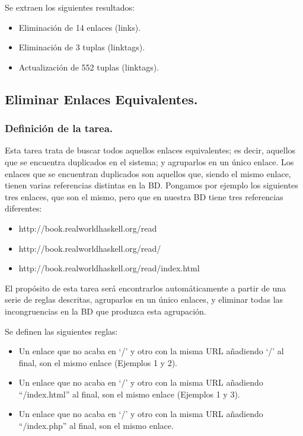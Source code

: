 Se extraen los siguientes resultados:
\begin{itemize}
\item    Eliminación de 14 enlaces (links).
\item    Eliminación de 3 tuplas (linktags).
\item    Actualización de 552 tuplas (linktags).
\end{itemize}



\subsection{Eliminar Enlaces Equivalentes.}

\subsubsection{Definición de la tarea.}

Esta tarea trata de buscar todos aquellos enlaces equivalentes; es decir, aquellos que se encuentra duplicados en el sistema; y agruparlos en un único enlace. Los enlaces que se encuentran duplicados son aquellos que, siendo el mismo enlace, tienen varias referencias distintas en la BD. Pongamos por ejemplo los siguientes tres enlaces, que son el mismo, pero que en nuestra BD tiene tres referencias diferentes:
\begin{itemize}
  \item http://book.realworldhaskell.org/read
  \item http://book.realworldhaskell.org/read/
  \item http://book.realworldhaskell.org/read/index.html
\end{itemize}

El propósito de esta tarea será encontrarlos automáticamente a partir de una serie de reglas descritas, agruparlos en un único enlaces, y eliminar todas las incongruencias en la BD que produzca esta agrupación.

Se definen las siguientes reglas:
\begin{itemize}
\item    Un enlace que no acaba en ‘/’ y otro con la misma URL añadiendo ‘/’ al final, son el mismo enlace (Ejemplos 1 y 2).
\item    Un enlace que no acaba en ‘/’ y otro con la misma URL añadiendo “/index.html” al final, son el mismo enlace (Ejemplos 1 y 3).
\item    Un enlace que no acaba en ‘/’ y otro con la misma URL añadiendo “/index.php” al final, son el mismo enlace.
\end{itemize}

